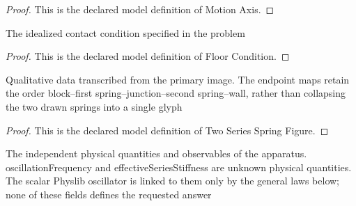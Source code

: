\begin{proof}
  This is the declared model definition of Motion Axis.
\end{proof}
\begin{definition}
  \label{def:physics:phyx-mini-0256:phyxminiproblems-problemphyxmini0256-floorcondition}
  The idealized contact condition specified in the problem
\end{definition}
\begin{proof}
  This is the declared model definition of Floor Condition.
\end{proof}
\begin{definition}
  \label{def:physics:phyx-mini-0256:phyxminiproblems-problemphyxmini0256-twoseriesspringfigure}
  Qualitative data transcribed from the primary image. The endpoint maps retain the order block--first spring--junction--second spring--wall, rather than collapsing the two drawn springs into a single glyph
\end{definition}
\begin{proof}
  This is the declared model definition of Two Series Spring Figure.
\end{proof}
\begin{definition}
  \label{def:physics:phyx-mini-0256:phyxminiproblems-problemphyxmini0256-seriesspringblocksetup}
  The independent physical quantities and observables of the apparatus. oscillationFrequency and effectiveSeriesStiffness are unknown physical quantities. The scalar Physlib oscillator is linked to them only by the general laws below; none of these fields defines the requested answer
\end{definition}
